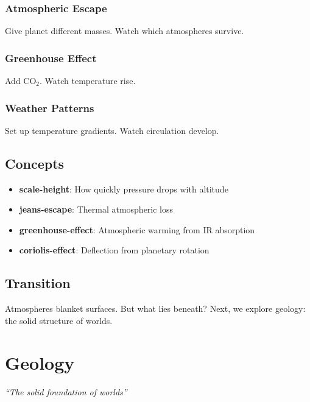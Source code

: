 \documentclass[
  11pt,
  letterpaper,
  twoside,
  openright]{book}
\providecommand{\tightlist}{%
  \setlength{\itemsep}{0pt}\setlength{\parskip}{0pt}}
\begin{document}
\subsection{Atmospheric Escape}\label{atmospheric-escape-1}

Give planet different masses. Watch which atmospheres survive.

\subsection{Greenhouse Effect}\label{greenhouse-effect}

Add \(\text{CO}_2\). Watch temperature rise.

\subsection{Weather Patterns}\label{weather-patterns}

Set up temperature gradients. Watch circulation develop.

\section{Concepts}\label{concepts-16}

\begin{itemize}
\tightlist
\item
  \textbf{scale-height}: How quickly pressure drops with altitude
\item
  \textbf{jeans-escape}: Thermal atmospheric loss
\item
  \textbf{greenhouse-effect}: Atmospheric warming from IR absorption
\item
  \textbf{coriolis-effect}: Deflection from planetary rotation
\end{itemize}

\section{Transition}\label{transition-16}

Atmospheres blanket surfaces. But what lies beneath? Next, we explore
geology: the solid structure of worlds.

\chapter{Geology}\label{sec-geology}

\emph{``The solid foundation of worlds''}
\end{document}
